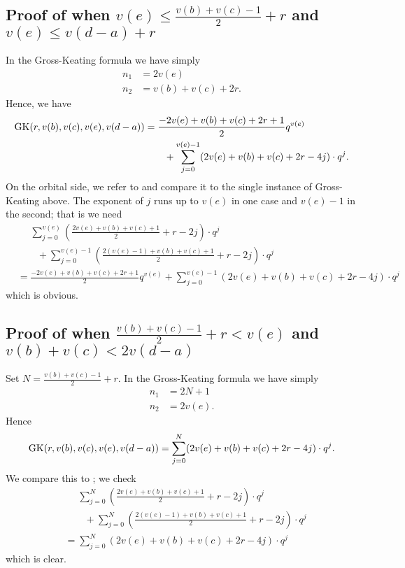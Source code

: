 \subsection{Proof of 
  when $v(e) \le \tfrac{v(b)+v(c)-1}{2} + r$
  and $v(e) \le v(d-a) + r$}
In the Gross-Keating formula we have simply
\begin{align*}
  n_1 &= 2v(e) \\
  n_2 &= v(b) + v(c) + 2r.
\end{align*}
Hence, we have
\begin{align*}
  \operatorname{GK}(r, v(b), v(c), v(e), v(d-a))
  &= \frac{-2v(e)+v(b)+v(c)+2r+1}{2} q^{v(e)} \\
  &\qquad+ \sum_{j=0}^{v(e)-1} (2v(e)+v(b)+v(c)+2r-4j) \cdot q^j.
\end{align*}
On the orbital side, we refer to 
and compare it to the single instance of Gross-Keating above.
The exponent of $j$ runs up to $v(e)$ in one case and $v(e)-1$ in the second;
that is we need
\begin{align*}
  &\phantom= \sum_{j=0}^{v(e)} \left( \frac{2v(e)+v(b)+v(c)+1}{2} + r - 2j \right) \cdot q^j \\
  &\qquad+ \sum_{j=0}^{v(e)-1} \left( \frac{2(v(e)-1)+v(b)+v(c)+1}{2} + r - 2j \right) \cdot q^j \\
  &= \frac{-2v(e)+v(b)+v(c)+2r+1}{2} q^{v(e)}
  + \sum_{j=0}^{v(e)-1} (2v(e)+v(b)+v(c)+2r-4j) \cdot q^j
\end{align*}
which is obvious.

\subsection{Proof of 
  when $\tfrac{v(b)+v(c)-1}{2} + r < v(e)$
  and $v(b)+v(c) < 2v(d-a)$}

Set $N = \frac{v(b)+v(c)-1}{2} + r$.
In the Gross-Keating formula we have simply
\begin{align*}
  n_1 &= 2N+1 \\
  n_2 &= 2v(e).
\end{align*}
Hence
\[ \operatorname{GK}(r, v(b), v(c), v(e), v(d-a))
  = \sum_{j=0}^N (2v(e)+v(b)+v(c)+2r-4j) \cdot q^j. \]
We compare this to ; we check
\begin{align*}
  &\phantom= \sum_{j=0}^{N} \left( \frac{2v(e)+v(b)+v(c)+1}{2} + r - 2j \right) \cdot q^j \\
  &\qquad+ \sum_{j=0}^{N} \left( \frac{2(v(e)-1)+v(b)+v(c)+1}{2} + r - 2j \right) \cdot q^j \\
  &= \sum_{j=0}^N (2v(e)+v(b)+v(c)+2r-4j) \cdot q^j
\end{align*}
which is clear.

